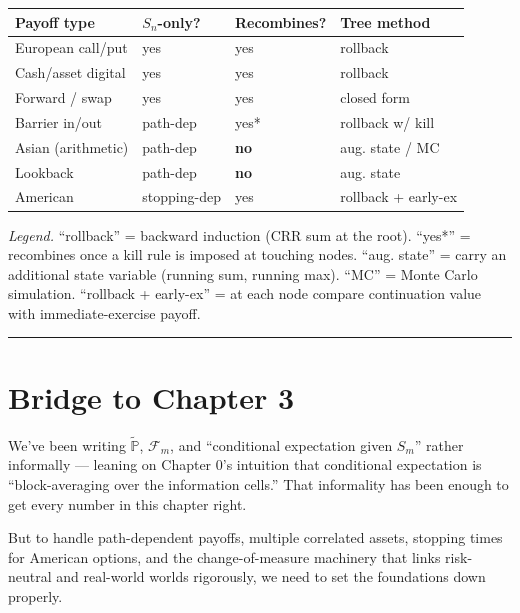 \documentclass[
  10pt,
  twoside]{book}
\newcounter{none} %
\begin{document}
{\def\LTcaptype{none} %
\begin{table}[H]
\centering
\begin{tabular}{|l|l|l|l|}
\toprule
Payoff type & \(S_n\)-only? & Recombines? & Tree method \\
\midrule



European call/put & yes & yes & rollback \\
Cash/asset digital & yes & yes & rollback \\
Forward / swap & yes & yes & closed form \\
Barrier in/out & path-dep & yes* & rollback w/ kill \\
Asian (arithmetic) & path-dep & \textbf{no} & aug. state / MC \\
Lookback & path-dep & \textbf{no} & aug. state \\
American & stopping-dep & yes & rollback + early-ex \\
\bottomrule
\end{tabular}
\end{table}
}

\emph{Legend.} ``rollback'' = backward induction (CRR sum at the root).
``yes*'' = recombines once a kill rule is imposed at touching nodes.
``aug. state'' = carry an additional state variable (running sum,
running max). ``MC'' = Monte Carlo simulation. ``rollback + early-ex'' =
at each node compare continuation value with immediate-exercise payoff.

\begin{center}\rule{0.5\linewidth}{0.5pt}\end{center}

\section{Bridge to Chapter 3}\label{bridge-to-chapter-3}

We've been writing \(\tilde{\mathbb P}\), \(\mathcal F_m\), and
``conditional expectation given \(S_m\)'' rather informally --- leaning
on Chapter 0's intuition that conditional expectation is
``block-averaging over the information cells.'' That informality has
been enough to get every number in this chapter right.

But to handle path-dependent payoffs, multiple correlated assets,
stopping times for American options, and the change-of-measure machinery
that links risk-neutral and real-world worlds rigorously, we need to set
the foundations down properly.
\end{document}
